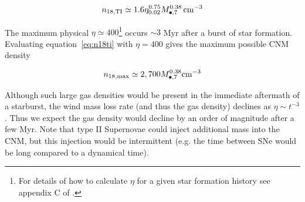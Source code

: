 \documentclass[usenatbib,fleqn]{mnras}
\newcommand{\Mbh}[1][]{M_{\bullet#1}}
\begin{document}
\begin{equation}
n_{\rm 18,TI}\simeq 1.6 \eta_{0.02}^{0.75} \Mbh[,7]^{0.38} \, {\rm cm^{-3}}
\label{eq:n18ti}
\end{equation}

The maximum physical $\eta\simeq 400$\footnote{For details
  of how to calculate $\eta$ for a given star formation history see
  appendix C of \citet{Generozov+2015}.} occurs $\sim 3$ Myr after a
burst of star formation. Evaluating equation~\eqref{eq:n18ti} with
$\eta=400$ gives the maximum possible CNM density

\begin{equation}
n_{\rm 18,max} \simeq 2,700 \Mbh[,7]^{0.38} {\rm cm^{-3}}
\label{eq:n18max}
\end{equation}

Although such large gas densities would be present in the immediate
aftermath of a starburst, the wind mass loss rate (and thus the gas
density) declines as $\eta \sim t^{-3}$. Thus we expect the gas density would
decline by an order of magnitude after a few Myr. Note that type II
Supernovae could inject additional mass into the CNM, but this
injection would be intermittent (e.g. the time between SNe would be
long compared to a dynamical time).



\end{document}
